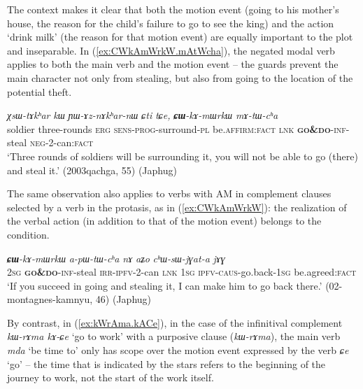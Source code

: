 \documentclass[oneside,a4paper,11pt]{article}
\newcommand{\ipa}[1]{{\phon\textit{#1}}}
\newcommand{\forme}[1]{\textit{\phon#1}}
\newcommand{\japhug}[2]{\textit{\phon#1} `#2'}
\newcommand{\rouge}[1]{\textbf{#1}}
\begin{document}
The context makes it clear that both the motion event (going to his mother's house, the reason for the child's failure to go to see the king) and the action `drink milk' (the reason for that motion event) are equally important to the plot and inseparable. 
 In (\ref{ex:CWkAmWrkW.mAtWcha}), the negated modal verb applies to both the main verb and the motion event -- the guards prevent the main character not only from stealing, but also from going to the location of the potential theft.
 
\begin{exe}
\ex \label{ex:CWkAmWrkW.mAtWcha}
\gll \ipa{ʁmaʁ}	\ipa{χsɯ-tɤkʰar}	\ipa{kɯ}	\ipa{ɲɯ-ɤz-nɤkʰar-nɯ}	\ipa{ɕti}	\ipa{tɕe,}	\ipa{\rouge{ɕɯ}-kɤ-mɯrkɯ}	\ipa{mɤ-tɯ-cʰa}  \\
soldier three-rounds \textsc{erg} \textsc{sens}-\textsc{prog}-surround-\textsc{pl} be.\textsc{affirm}:\textsc{fact} \textsc{lnk}  \rouge{\textsc{go\&do}}-\textsc{inf}-steal \textsc{neg}-2-can:\textsc{fact} \\
\glt `Three rounds of soldiers will be surrounding it, you will not be able to go (there) and steal it.' (2003qachga, 55) (Japhug)
   \end{exe}
 
The same observation also applies to  verbs with AM in complement clauses selected by a verb in the protasis, as in (\ref{ex:CWkAmWrkW}): the realization of the verbal action (in addition to that of the motion event) belongs to the condition.

\begin{exe}
\ex \label{ex:CWkAmWrkW}
\gll \ipa{nɤʑo}	\ipa{\rouge{ɕɯ}-kɤ-mɯrkɯ}	\ipa{a-pɯ-tɯ-cʰa}	\ipa{nɤ}	\ipa{aʑo}	\ipa{cʰɯ-sɯ-jɣat-a}	\ipa{jɤɣ} \\
\textsc{2sg} \rouge{\textsc{go\&do}}-\textsc{inf}-steal \textsc{irr}-\textsc{ipfv}-2-can \textsc{lnk} \textsc{1sg} \textsc{ipfv}-\textsc{caus}-go.back-\textsc{1sg} be.agreed:\textsc{fact} \\
\glt `If you succeed in going and stealing it, I can make him to go back there.' (02-montagnes-kamnyu, 46) (Japhug)
\end{exe}

By contrast, in  (\ref{ex:kWrAma.kACe}), in the case of the infinitival complement \forme{kɯ-rɤma kɤ-ɕe} `go to work' with a purposive clause (\forme{kɯ-rɤma}), the main verb \japhug{mda}{be time to} only has scope over the motion event expressed by the verb \japhug{ɕe}{go} -- the time that is indicated by the stars refers to the beginning of the journey to work, not the start of the work itself.
 
\end{document}
